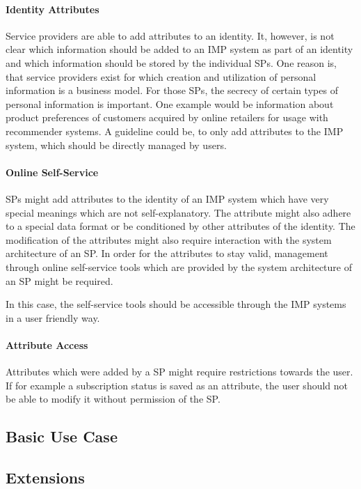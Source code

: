 \documentclass[
     12pt,         %
     a4paper,      %
     BCOR=10mm,version=first,     %
     DIV=14,version=first,        %
     ]{scrreprt}
\begin{document}
\paragraph{Identity Attributes}
Service providers are able to add attributes to an identity. It, however, is not clear which information should be added to an IMP system as part of an identity and which information should be stored by the individual SPs. One reason is, that service providers exist for which creation and utilization of personal information is a business model. For those SPs, the secrecy of certain types of personal information is important. One example would be information about product preferences of customers acquired by online retailers for usage with recommender systems.
A guideline could be, to only add attributes to the IMP system, which should be directly managed by users.

\paragraph{Online Self-Service}
SPs might add attributes to the identity of an IMP system which have very special meanings which are not self-explanatory. The attribute might also adhere to a special data format or be conditioned by other attributes of the identity. The modification of the attributes might also require interaction with the system architecture of an SP. In order for the attributes to stay valid, management through online self-service tools which are provided by the system architecture of an SP might be required.

In this case, the self-service tools should be accessible through the IMP systems in a user friendly way.

\paragraph{Attribute Access}
Attributes which were added by a SP might require restrictions towards the user. If for example a subscription status is saved as an attribute, the user should not be able to modify it without permission of the SP.

\subsection{Basic Use Case}

\subsection{Extensions}
\end{document}
